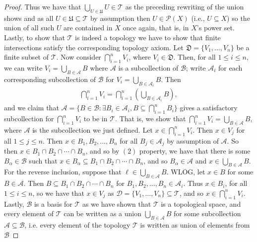 \documentclass[10pt,reqno]{amsart}
\theoremstyle{definition}
\begin{document}
\begin{tcolorbox}[colback=black!5!white,colframe=black!75!black,title= Chapter 3 $\S3.2$: Exercise 3.1.]
\begin{proof}
Thus we have that $\bigcup_{U \in \mathfrak U} U \in \mathcal T$ as the preceding rewriting of the union shows and as all $ U \in \mathfrak U \subseteq \mathcal T$ by assumption then $U \in \mathcal P (X)$ (i.e., $U \subseteq X$) so the union of all such $U$ are contained in $X$ once again, that is, in $X$'s power set. Lastly, to show that $\mathcal T$ is indeed a topology we have to show that finite intersections satisfy the corresponding topology axiom. Let $\mathfrak D = \{ V_1, \ldots, V_n \}$ be a finite subset of $\mathcal T$. Now consider $\bigcap_{i =1}^n V_i$, where $V_i \in \mathfrak D$. Then, for all $ 1 \leq i \leq n$, we can write $V_i = \bigcup _{B \in \mathcal A} B$ where $\mathcal A$ is a subcollection of $\mathcal B$; write $\mathcal A_{i}$ for each corresponding subcollection of $\mathcal B$ for $V_i = \bigcup_{B \in \mathcal A_{i}} B$. Then 
\begin{align*}
\bigcap_{i=1}^n V_i = \bigcap_{i =1}^n \left ( \bigcup_{B \in \mathcal A_{i}} B \right),\end{align*}
and we claim that $\mathcal A = \{ B \in \mathcal B \colon \exists B_i \in \mathcal A_i, B \subseteq \bigcap _{i=1}^n B_i \}$ gives a satisfactory subcollection for $\bigcap_{i=1}^n V_i$ to be in $\mathcal T$. That is, we show that $\bigcap_{i=1}^n V_i = \bigcup _{B \in \mathcal A } B$, where $\mathcal A$ is the subcollection we just defined. Let $x \in \bigcap _{i=1}^n V_i$. Then $x \in V_j$ for all $1 \leq j \leq n$. Then $x \in B_1, B_2, \ldots, B_n$ for all $B_j \in \mathcal A_j$ by assumption of $\mathcal A$. So then $x \in B_1 \cap B_2 \cap \cdots \cap B_n$, and so by $(2)$ property, we have that there is some $B_\alpha \in \mathcal B$ such that $x \in B_\alpha \subseteq B_1 \cap B_2 \cap \cdots \cap B_n$, and so $B_\alpha \in \mathcal A$ and $x \in \bigcup _{B \in \mathcal A} B$. For the reverse inclusion, suppose that $\ell \in \bigcup _{B \in \mathcal A} B$. WLOG, let $x \in B$ for some $B \in \mathcal A$. Then $B \subseteq B_1 \cap B_2 \cap \cdots \cap B_n$ for $B_1, B_2, \ldots, B_n \in \mathcal A_i$. Thus $x \in B_i$, for all $1 \leq i \leq n$, so we have that $x \in V_j$ as $\mathcal D =\{V_1, \ldots, V_n \} \subseteq \mathcal T$, and so $x \in \bigcap _{i=1}^n V_i$. Lastly, $\mathcal B$ is a basis for $\mathcal T$ as we have shown that $\mathcal T$ is a topological space, and every element of $\mathcal T$ can be written as a union $\bigcup_{B \in \mathcal A} B$ for some subcollection $\mathcal A \subseteq \mathcal B$, i.e. every element of the topology $\mathcal T$ is written as union of elements from $\mathcal B$



\end{proof}
\end{tcolorbox}
\end{document}
